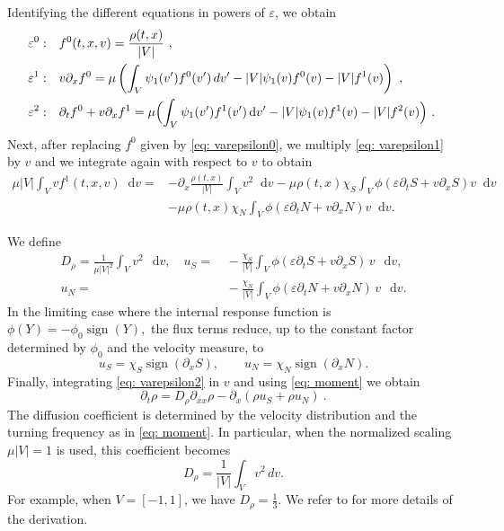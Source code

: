 \documentclass[11pt,twoside]{article}
\numberwithin{equation}{section}
\DeclareMathOperator{\sign}{sign}
\newcommand*\diff{\mathop{}\!\mathrm{d}}
\theoremstyle{plain}
\theoremstyle{nonumberplain}
\begin{document}
{\noindent Identifying the different equations in powers of $\varepsilon$, we obtain
\fi
\begin{align}
    \varepsilon^0: & \quad f^0(t,{x},{v})=\frac{\rho(t,{x})}{|V|}\ ,\label{eq: varepsilon0}\\
    \varepsilon^1: & \quad 
    v \partial_x f^0
=
\mu \left(
\int_V \psi_1(v') f^0(v')\,dv'
- |V| \psi_1(v) f^0(v)
- |V| f^1(v)
\right)\ ,\label{eq: varepsilon1}\\
    \varepsilon^2: & \quad \partial_tf^0+{v}\partial_x f^1 =\mu\Bigl(\int_V\psi_1(v')f^1(v')\diff v'-|V|\psi_1(v)f^1(v)-|V|f^2(v)\Bigr) \ \label{eq: varepsilon2}.\
\end{align}
Next, after replacing $f^0$ given by  \eqref{eq: varepsilon0}, we multiply \eqref{eq: varepsilon1} by ${v}$ and we integrate again with respect to ${v}$ to obtain
\begin{align}
    \mu|V|\int_V vf^1(t,x,v) \diff v=&-\partial_x\frac{\rho(t,x)}{|V|}\int_V v^2\diff v-\mu\rho(t,x)\chi_S\int_V\phi(\varepsilon\partial_tS+v\partial_xS)v\diff v\nonumber\\ &-\mu\rho(t,x)\chi_N\int_V\phi(\varepsilon\partial_tN+v\partial_xN)v\diff v.\label{eq: mean direction}
\end{align}

We define
\begin{align}
    D_\rho
=
\frac{1}{\mu |V|^2}\int_V v^2\,\diff v,
\quad
u_S
=&\,
-\frac{\chi_S}{|V|}
\int_V \phi(\varepsilon\partial_t S+v\partial_x S)\,v\,\diff v,
\nonumber\\
u_N
=&\,
-\frac{\chi_N}{|V|}
\int_V \phi(\varepsilon\partial_t N+v\partial_x N)\,v\,\diff v .
\label{eq: moment}
\end{align}
In the limiting case where the internal response function is $\phi(Y)=-\phi_0\sign(Y),$
the flux terms reduce, up to the constant factor determined by
$\phi_0$ and the velocity measure, to \cite{calvez2019chemotactic}
\[
u_S=\chi_S\sign(\partial_x S),
\qquad
u_N=\chi_N\sign(\partial_x N).
\]
Finally, integrating \eqref{eq: varepsilon2} in ${v}$ and using \eqref{eq: moment} we obtain
\[
\partial_t\rho=D_\rho\partial_{xx}\rho-\partial_x(\rho u_S+\rho u_N)\ .
\]
{
The diffusion coefficient is determined by the velocity distribution and
the turning frequency as in \eqref{eq: moment}. 
In particular, when the normalized scaling \(\mu |V|=1\) is used, this
coefficient becomes
\begin{equation}
\label{def:Drho}
  D_\rho
=
\frac1{|V|}
\int_V v^2\,dv .  
\end{equation}
For example, when \( V = [-1,1] \), we have $D_\rho = \frac{1}{3}$.
}
We refer to \cite{emako2015existence,emako2016traveling} for more details of the derivation.

}
\end{document}
